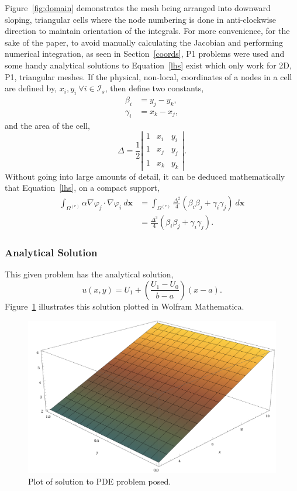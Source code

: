 Figure~\ref{fig:domain} demonstrates the mesh being arranged into downward sloping, triangular cells where the node numbering is done in anti-clockwise direction to maintain orientation of the integrals. For more convenience, for the sake of the paper, to avoid manually calculating the Jacobian and performing numerical integration, as seen in Section~\ref{coords}, P1 problems were used and some handy analytical solutions to Equation~\eqref{lhs} exist which only work for 2D, P1, triangular meshes. If the physical, non-local, coordinates of a nodes in a cell are defined by, $x_i, y_i~\forall i \in \mathcal{I}_s$, then define two constants,
\begin{align}
	\beta_i &= y_j - y_k,\\
	\gamma_i &= x_k - x_j,
\end{align} 
and the area of the cell,
\begin{equation}
	\Delta = \frac{1}{2}\left\vert
	\begin{matrix}
		1 & x_i & y_i \\
		1 & x_j & y_j \\
		1 & x_k & y_k
	\end{matrix}\right\vert.
\end{equation}
Without going into large amounts of detail, it can be deduced mathematically that Equation~\eqref{lhs}, on a compact support,
\begin{align}
	\int_{\Omega^{(e)}} \alpha \nabla \varphi_j \cdot \nabla \varphi_i~d\mathbf{x} &= \int_{\Omega^{(e)}}\frac{\Delta^2}{4}(\beta_i\beta_j + \gamma_i\gamma_j)~d\mathbf{x}\\
	&= \frac{\Delta^3}{4}(\beta_i\beta_j + \gamma_i\gamma_j).\label{conv}
\end{align}
\cite{mardal}

\subsubsection{Analytical Solution}

This given problem has the analytical solution,
\begin{equation}
	u(x,y) = U_1 + \left(\frac{U_1 - U_0}{b - a}\right) (x - a).
\end{equation}
Figure~\ref{fig:soln} illustrates this solution plotted in Wolfram Mathematica.
\begin{figure}
	\centering
	\includegraphics[width=0.6\linewidth]{Figures/soln}
	\caption{Plot of solution to PDE problem posed.}
	\label{fig:soln}
\end{figure}

